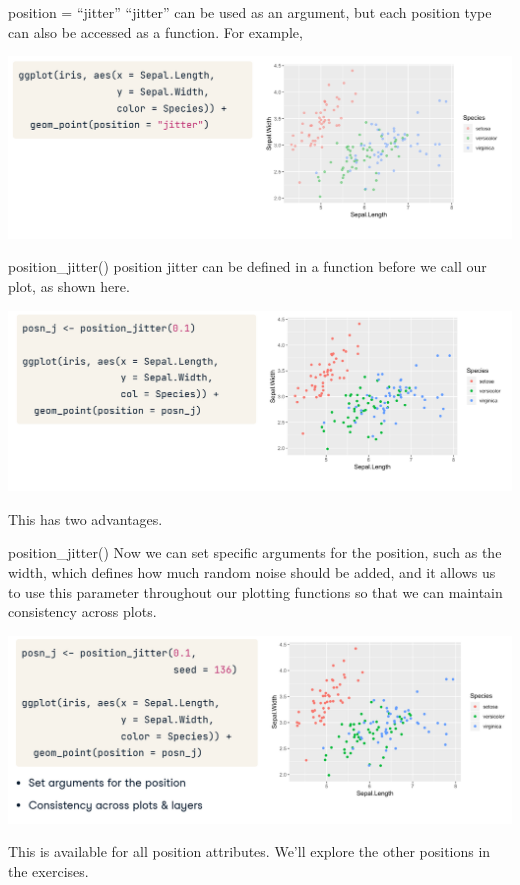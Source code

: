 \documentclass[
  ignorenonframetext,
]{beamer}
\begin{document}
\begin{frame}{position = ``jitter''}
\label{position-jitter}
``jitter'' can be used as an argument, but each position type can also
be accessed as a function. For example,

\includegraphics{../images/im155.png}
\end{frame}

\begin{frame}{position\_jitter()}
\label{position_jitter}
position jitter can be defined in a function before we call our plot, as
shown here.

\includegraphics{../images/im156.png}

This has two advantages.
\end{frame}

\begin{frame}{position\_jitter()}
\label{position_jitter-1}
Now we can set specific arguments for the position, such as the width,
which defines how much random noise should be added, and it allows us to
use this parameter throughout our plotting functions so that we can
maintain consistency across plots.

\includegraphics{../images/im157.png}

This is available for all position attributes. We'll explore the other
positions in the exercises.
\end{frame}
\end{document}
